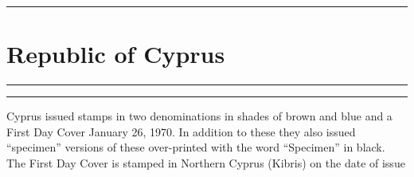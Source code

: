 \documentclass[a4paper]{article}
\begin{document}
  \hrule
\section*{Republic of Cyprus}
\vspace{8pt}
\hrule
\vspace{17cm}
\begin{center}
\begin{minipage}{12cm}
  \hrule \vspace{12pt} Cyprus issued stamps in two denominations in
  shades of brown and blue and a First Day Cover January 26, 1970. In
  addition to these they also issued ``specimen'' versions of these
  over-printed with the word ``Specimen'' in black. The First Day Cover is
  stamped in Northern Cyprus (Kibris) on the date of issue
\end{minipage}
\end{center}

\end{document}
